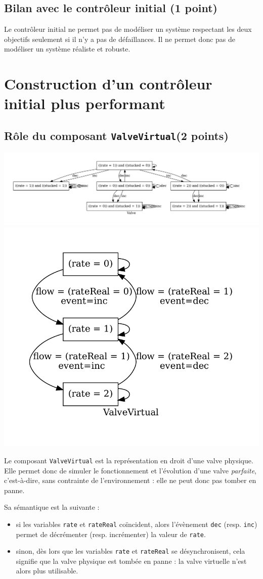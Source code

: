\documentclass[a4paper]{book}
\begin{document}
\subsection{Bilan avec le contrôleur initial (1 point)}

Le contrôleur initial ne permet pas de modéliser un système respectant les deux
objectifs seulement si il n'y a pas de défaillances. Il ne permet donc pas de
modéliser un système réaliste et robuste.

\section{Construction d'un contrôleur initial plus performant}
\subsection{Rôle du composant {\tt ValveVirtual}(2 points)}
\includegraphics[height=.2\textheight,width=.5\textwidth]{Graphs/Valve-modes.pdf}
\includegraphics[height=.2\textheight,width=.5\textwidth]{Graphs/ValveVirtual-modes.pdf}

Le composant \texttt{ValveVirtual} est la représentation en droit d'une valve
physique. Elle permet donc de simuler le fonctionnement et l'évolution d'une
valve \textit{parfaite}, c'est-à-dire, sans contrainte de l'environnement :
elle ne peut donc pas tomber en panne.

Sa sémantique est la suivante :
\begin{itemize}
  \item si les variables \texttt{rate} et \texttt{rateReal} coïncident, alors
    l'évènement \texttt{dec} (resp. \texttt{inc}) permet de décrémenter (resp.
    incrémenter) la valeur de \texttt{rate}.
  \item sinon, dès lors que les variables \texttt{rate} et \texttt{rateReal} se
    désynchronisent, cela signifie que la valve physique est tombée en panne :
    la valve virtuelle n'est alors plus utilisable.
\end{itemize}
\end{document}
